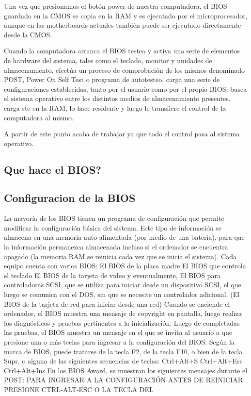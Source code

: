 \documentclass[12pt,oneside,a4paper]{article}
\begin{document}
	Una vez que presionamos el botón power de nuestra computadora, el BIOS
	guardado en la CMOS se copia en la RAM y es ejecutado por el
	microprocesador, aunque en las motherboards actuales también puede ser
	ejecutado directamente desde la CMOS.

	Cuando la computadora arranca el BIOS testea y activa una serie de
	elementos de hardware del sistema, tales como el teclado, monitor y
	unidades de almacenamiento, efectúa un proceso de comprobación de los
	mismos denominado POST, Power On Self Test o programa de autotesteo, carga
	una serie de configuraciones establecidas, tanto por el usuario como por el
	propio BIOS, busca el sistema operativo entre los distintos medios de
	almacenamiento presentes, carga ste en la RAM, lo hace residente y luego le
	transfiere el control de la computadora al mismo.

	A partir de este punto acaba de trabajar ya que todo el control pasa al sistema
	operativo.

	\subsection{Que hace el BIOS?}{\label{sec:bios/que-hace-la-bios}}
	\subsection{Configuracion de la BIOS}{\label{sec:bios/configuracion-de-bios}}
	La mayoría de los BIOS tienen un programa de configuración que permite modificar la configuración básica del sistema. Este tipo de información se almacena en una memoria auto-alimentada (por medio de una batería), para que la información permanezca almacenada incluso si el ordenador se encuentra apagado (la memoria RAM se reinicia cada vez que se inicia el sistema).
	Cada equipo cuenta con varios BIOS: 
	El BIOS de la placa madre 
	El BIOS que controla el teclado 
	El BIOS de la tarjeta de video 
	y eventualmente, 
	El BIOS para controladoras SCSI, que se utiliza para iniciar desde un dispositivo SCSI, el que luego se comunica con el DOS, sin que se necesite un controlador adicional. 
	(El BIOS de la tarjeta de red para iniciar desde una red) 
	Cuando se enciende el ordenador, el BIOS muestra una mensaje de copyright en pantalla, luego realiza los diagnósticos y pruebas pertinentes a la inicialización. Luego de completadas las pruebas, el BIOS muestra un mensaje en el que se invita al usuario a que presione una o más teclas para ingresar a la configuración del BIOS. 
	Según la marca de BIOS, puede tratarse de la tecla F2, de la tecla F10, o bien de la tecla Supr, o alguna de las siguientes secuencias de teclas: 
	Ctrl+Alt+S 
	Ctrl+Alt+Esc 
	Ctrl+Alt+Ins 
	En los BIOS Award, se muestran los siguientes mensajes durante el POST:
	PARA INGRESAR A LA CONFIGURACIÓN ANTES DE REINICIAR PRESIONE CTRL-ALT-ESC O LA TECLA DEL
\end{document}
